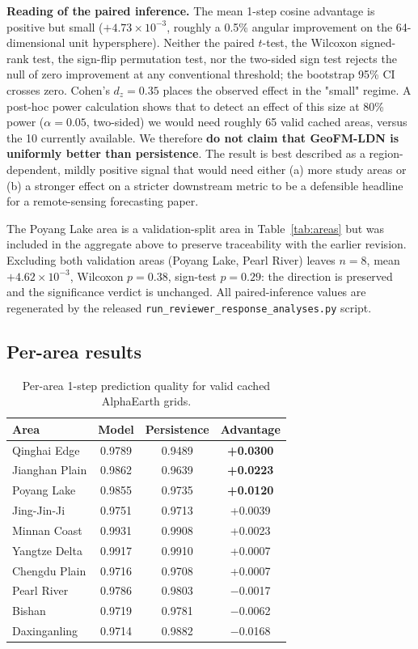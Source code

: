 \documentclass{article}
\begin{document}
\textbf{Reading of the paired inference.} The mean 1-step cosine advantage is positive but small ($+4.73\times 10^{-3}$, roughly a 0.5\% angular improvement on the 64-dimensional unit hypersphere). Neither the paired $t$-test, the Wilcoxon signed-rank test, the sign-flip permutation test, nor the two-sided sign test rejects the null of zero improvement at any conventional threshold; the bootstrap 95\% CI crosses zero. Cohen's $d_z = 0.35$ places the observed effect in the "small" regime. A post-hoc power calculation shows that to detect an effect of this size at 80\% power ($\alpha=0.05$, two-sided) we would need roughly 65 valid cached areas, versus the 10 currently available. We therefore \textbf{do not claim that GeoFM-LDN is uniformly better than persistence}. The result is best described as a region-dependent, mildly positive signal that would need either (a) more study areas or (b) a stronger effect on a stricter downstream metric to be a defensible headline for a remote-sensing forecasting paper.

The Poyang Lake area is a validation-split area in Table~\ref{tab:areas} but was included in the aggregate above to preserve traceability with the earlier revision. Excluding both validation areas (Poyang Lake, Pearl River) leaves $n=8$, mean $+4.62\times 10^{-3}$, Wilcoxon $p=0.38$, sign-test $p=0.29$: the direction is preserved and the significance verdict is unchanged. All paired-inference values are regenerated by the released \texttt{run\_reviewer\_response\_analyses.py} script.

\subsection{Per-area results}

\begin{table}[htbp]
\centering
\caption{Per-area 1-step prediction quality for valid cached AlphaEarth grids.}
\label{tab:perarea}
\begin{tabular}{lccc}
\toprule
Area & Model & Persistence & Advantage \\
\midrule
Qinghai Edge & 0.9789 & 0.9489 & \textbf{+0.0300} \\
Jianghan Plain & 0.9862 & 0.9639 & \textbf{+0.0223} \\
Poyang Lake & 0.9855 & 0.9735 & \textbf{+0.0120} \\
Jing-Jin-Ji & 0.9751 & 0.9713 & +0.0039 \\
Minnan Coast & 0.9931 & 0.9908 & +0.0023 \\
Yangtze Delta & 0.9917 & 0.9910 & +0.0007 \\
Chengdu Plain & 0.9716 & 0.9708 & +0.0007 \\
Pearl River & 0.9786 & 0.9803 & $-$0.0017 \\
Bishan & 0.9719 & 0.9781 & $-$0.0062 \\
Daxinganling & 0.9714 & 0.9882 & $-$0.0168 \\
\bottomrule
\end{tabular}
\end{table}
\end{document}
